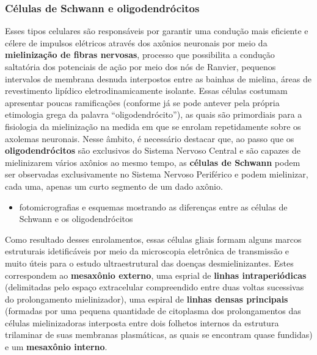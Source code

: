\documentclass[
]{book}
\providecommand{\tightlist}{%
  \setlength{\itemsep}{0pt}\setlength{\parskip}{0pt}}
\theoremstyle{definition}
\theoremstyle{definition}
\theoremstyle{definition}
\theoremstyle{definition}
\theoremstyle{remark}
\begin{document}
\hypertarget{cuxe9lulas-de-schwann-e-oligodendruxf3citos}{%
\subsubsection*{Células de Schwann e oligodendrócitos}\label{cuxe9lulas-de-schwann-e-oligodendruxf3citos}}

Esses tipos celulares são responsáveis por garantir uma condução mais eficiente e célere de impulsos elétricos através dos axônios neuronais por meio da \textbf{mielinização de fibras nervosas}, processo que possibilita a condução saltatória dos potenciais de ação por meio dos nós de Ranvier, pequenos intervalos de membrana desnuda interpostos entre as bainhas de mielina, áreas de revestimento lipídico eletrodinamicamente isolante. Essas células costumam apresentar poucas ramificações (conforme já se pode antever pela própria etimologia grega da palavra ``oligodendrócito''), as quais são primordiais para a fisiologia da mielinização na medida em que se enrolam repetidamente sobre os axolemas neuronais. Nesse âmbito, é necessário destacar que, ao passo que os \textbf{oligodendrócitos} são exclusivos do Sistema Nervoso Central e são capazes de mielinizarem vários axônios ao mesmo tempo, as \textbf{células de Schwann} podem ser observadas exclusivamente no Sistema Nervoso Periférico e podem mielinizar, cada uma, apenas um curto segmento de um dado axônio.

\begin{itemize}
\tightlist
\item
  fotomicrografias e esquemas mostrando as diferenças entre as células de Schwann e os oligodendrócitos
\end{itemize}

Como resultado desses enrolamentos, essas células gliais formam alguns marcos estruturais idetificáveis por meio da microscopia eletrônica de transmissão e muito úteis para o estudo ultraestrutural das doenças desmielinizantes. Estes correspondem ao \textbf{mesaxônio externo}, uma esprial de \textbf{linhas intraperiódicas} (delimitadas pelo espaço extracelular compreendido entre duas voltas sucessivas do prolongamento mielinizador), uma espiral de \textbf{linhas densas principais} (formadas por uma pequena quantidade de citoplasma dos prolongamentos das células mielinizadoras interposta entre dois folhetos internos da estrutura trilaminar de suas membranas plasmáticas, as quais se encontram quase fundidas) e um \textbf{mesaxônio interno}.
\end{document}
